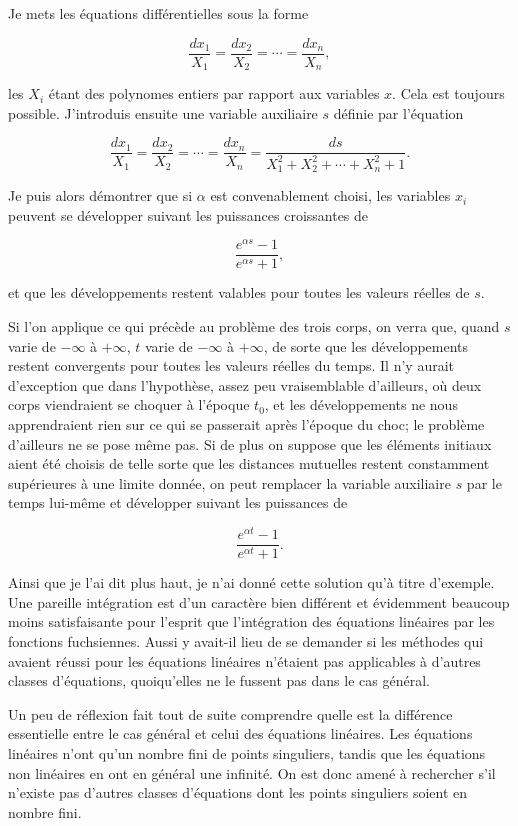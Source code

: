 \documentclass[11pt]{article}
\begin{document}
Je mets les équations différentielles sous la forme

\[
\frac{dx_1}{X_1}=\frac{dx_2}{X_2}=\cdots=\frac{dx_n}{X_n},
\]

les $X_i$ étant des polynomes entiers par rapport aux variables $x$. Cela est toujours possible. J’introduis ensuite une variable auxiliaire $s$ définie par l’équation

\[
\frac{dx_1}{X_1}=\frac{dx_2}{X_2}=\cdots=\frac{dx_n}{X_n}=\frac{ds}{X_1^2+X_2^2+\cdots+X_n^2+1}.
\]

Je puis alors démontrer que si $\alpha$ est convenablement choisi, les variables $x_i$ peuvent se développer suivant les puissances croissantes de

\[
\frac{e^{\alpha s}-1}{e^{\alpha s}+1},
\]

et que les développements restent valables pour toutes les valeurs réelles de $s$.

Si l’on applique ce qui précède au problème des trois corps, on verra que, quand $s$ varie de $-\infty$ à $+\infty$, $t$ varie de $-\infty$ à $+\infty$, de sorte que les développements restent convergents pour toutes les valeurs réelles du temps. Il n’y aurait d’exception que dans l’hypothèse, assez peu vraisemblable d’ailleurs, où deux corps viendraient se choquer à l’époque $t_0$, et les développements ne nous apprendraient rien sur ce qui se passerait après l’époque du choc; le problème d’ailleurs ne se pose même pas. Si de plus on suppose que les éléments initiaux aient été choisis de telle sorte que les distances mutuelles restent constamment supérieures à une limite donnée, on peut remplacer la variable auxiliaire $s$ par le temps lui-même et développer suivant les puissances de

\[
\frac{e^{\alpha t}-1}{e^{\alpha t}+1}.
\]

Ainsi que je l’ai dit plus haut, je n’ai donné cette solution qu’à titre d’exemple. Une pareille intégration est d’un caractère bien différent et évidemment beaucoup moins satisfaisante pour l’esprit que l’intégration des équations linéaires par les fonctions fuchsiennes. Aussi y avait-il lieu de se demander si les méthodes qui avaient réussi pour les équations linéaires n’étaient pas applicables à d’autres classes d’équations, quoiqu’elles ne le fussent pas dans le cas général.

Un peu de réflexion fait tout de suite comprendre quelle est la différence essentielle entre le cas général et celui des équations linéaires. Les équations linéaires n’ont qu’un nombre fini de points singuliers, tandis que les équations non linéaires en ont en général une infinité. On est donc amené à rechercher s’il n’existe pas d’autres classes d’équations dont les points singuliers soient en nombre fini.
\end{document}
